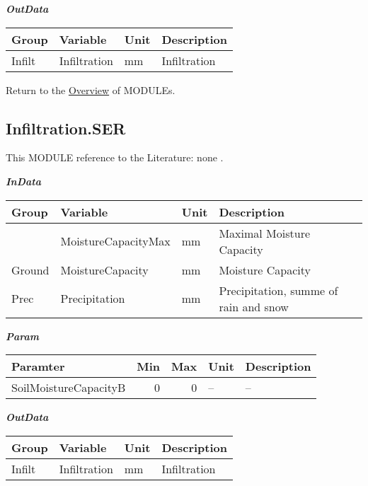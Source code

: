 \documentclass[
]{book}
\begin{document}
\textbf{\emph{OutData}}

\begin{table}[!h]
\centering
\begin{tabular}{l|l|l|l}
\hline
Group & Variable & Unit & Description\\
\hline
Infilt & Infiltration & mm & Infiltration\\
\hline
\end{tabular}
\end{table}

Return to the \protect\hyperlink{module}{Overview} of MODULEs.

\hypertarget{Infiltration.SER}{%
\subsection{Infiltration.SER}\label{Infiltration.SER}}

This MODULE reference to the Literature: none \citep{none}.

\textbf{\emph{InData}}

\begin{table}[!h]
\centering
\begin{tabular}{l|l|l|l}
\hline
Group & Variable & Unit & Description\\
\hline
 & MoistureCapacityMax & mm & Maximal Moisture Capacity\\
\cline{2-4}
\multirow{-2}{*}{\raggedright\arraybackslash Ground} & MoistureCapacity & mm & Moisture Capacity\\
\cline{1-4}
Prec & Precipitation & mm & Precipitation, summe of rain and snow\\
\hline
\end{tabular}
\end{table}

\textbf{\emph{Param}}

\begin{table}[!h]
\centering
\begin{tabular}{l|r|r|l|l}
\hline
Paramter & Min & Max & Unit & Description\\
\hline
SoilMoistureCapacityB & 0 & 0 & -- & --\\
\hline
\end{tabular}
\end{table}

\textbf{\emph{OutData}}

\begin{table}[!h]
\centering
\begin{tabular}{l|l|l|l}
\hline
Group & Variable & Unit & Description\\
\hline
Infilt & Infiltration & mm & Infiltration\\
\hline
\end{tabular}
\end{table}
\end{document}
